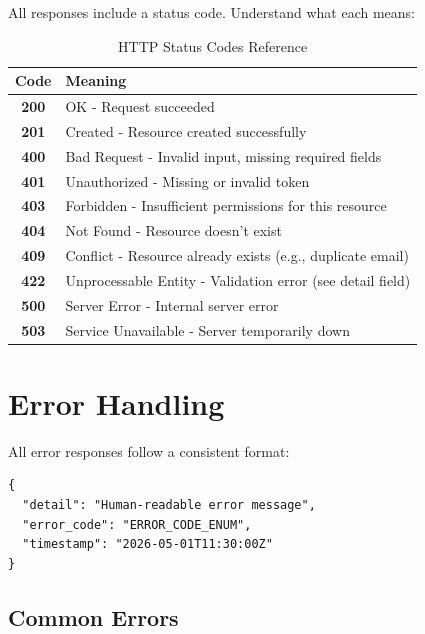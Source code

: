 \documentclass[12pt,a4paper,oneside]{article}
\begin{document}
All responses include a status code. Understand what each means:

\begin{table}[H]
\centering
\small
\begin{tabular}{|c|l|}
\hline
\textbf{Code} & \textbf{Meaning} \\
\hline
\textbf{200} & OK - Request succeeded \\
\hline
\textbf{201} & Created - Resource created successfully \\
\hline
\textbf{400} & Bad Request - Invalid input, missing required fields \\
\hline
\textbf{401} & Unauthorized - Missing or invalid token \\
\hline
\textbf{403} & Forbidden - Insufficient permissions for this resource \\
\hline
\textbf{404} & Not Found - Resource doesn't exist \\
\hline
\textbf{409} & Conflict - Resource already exists (e.g., duplicate email) \\
\hline
\textbf{422} & Unprocessable Entity - Validation error (see detail field) \\
\hline
\textbf{500} & Server Error - Internal server error \\
\hline
\textbf{503} & Service Unavailable - Server temporarily down \\
\hline
\end{tabular}
\caption{HTTP Status Codes Reference}
\end{table}

\newpage

\section{Error Handling}

All error responses follow a consistent format:

\begin{lstlisting}
{
  "detail": "Human-readable error message",
  "error_code": "ERROR_CODE_ENUM",
  "timestamp": "2026-05-01T11:30:00Z"
}
\end{lstlisting}

\subsection{Common Errors}
\end{document}
